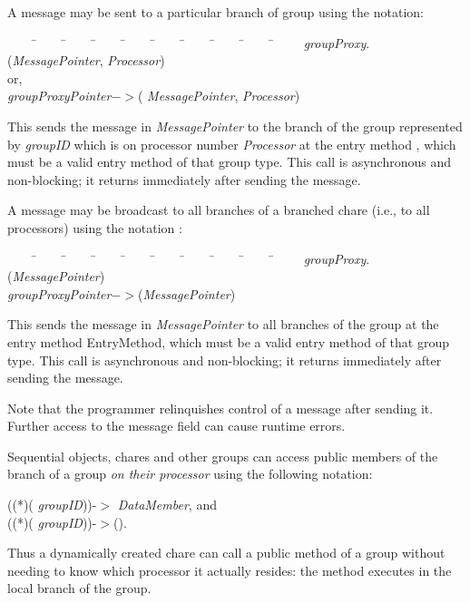 A message may be sent to a particular branch of group using the
notation:

\begin{tabbing} ~~~~ \=~~~~ \=~~~~ \=~~~~ \=~~~~ \=~~~~ \=~~~~ \=~~~~ \=~~~~
\=~~~~ \kill \> {\it groupProxy}$.$({\it MessagePointer}, {\it
Processor}) \\ \> \> or, \\ \> {\it groupProxyPointer}$->$({\it
MessagePointer}, {\it Processor}) \end{tabbing}

This sends the message in {\it MessagePointer} to the branch of
the group represented by {\it groupID} which is on processor number {\it
Processor} at the entry method , which must be a valid entry
method of that group type. This call is asynchronous and non-blocking; it
returns immediately after sending the message.

A message may be broadcast  to all branches of a branched
chare (i.e., to all processors) using the notation :

\begin{tabbing} ~~~~ \=~~~~ \=~~~~ \=~~~~ \=~~~~ \=~~~~ \=~~~~ \=~~~~ \=~~~~
\=~~~~ \kill \> {\it groupProxy}$.$({\it MessagePointer}) \\ \>
{\it groupProxyPointer}$->$({\it MessagePointer}) \end{tabbing}

This sends the message in {\it MessagePointer} to all branches of the group at
the entry method {\sf EntryMethod}, which must be a valid entry method of that
group type. This call is asynchronous and non-blocking; it returns immediately
after sending the message.

Note that the programmer relinquishes control of a message after sending it.
Further access to the message field can cause runtime errors.


Sequential objects, chares and other groups can access public members of the
branch of a group  {\it on their processor} using
the following notation:

((*)( {\it groupID}))-$>${\it
DataMember}, and \\ ((*)( {\it
groupID}))-$>$().  

Thus a dynamically created chare can call a public method of a
group without needing to know which processor it actually resides: the method
executes in the local branch of the group. 

